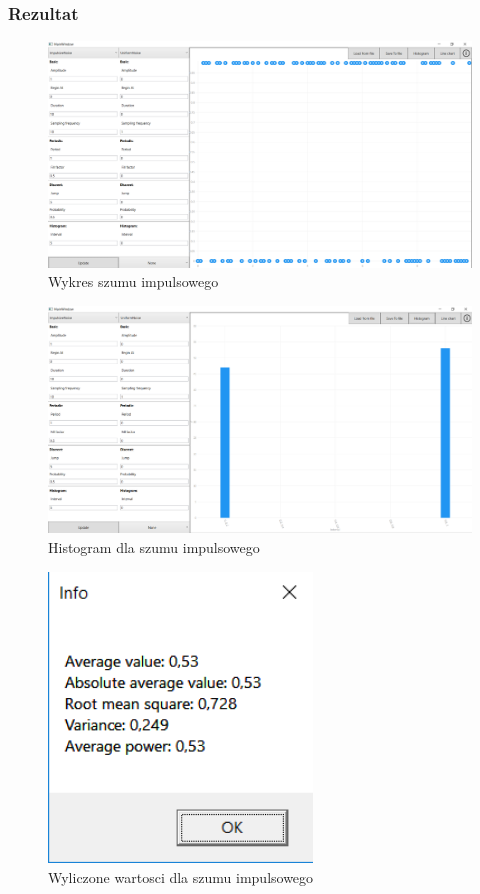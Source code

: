 \documentclass[12pt]{article}
\begin{document}
\subsubsection{Rezultat}

\begin{figure}[H]
 \centering
 \includegraphics[width=14cm]{images/imp1.PNG}
 \vspace{-0.3cm}
 \caption{Wykres szumu impulsowego}
 \label{gui}
\end{figure}

\begin{figure}[H]
 \centering
 \includegraphics[width=14cm]{images/imp1hist.PNG}
 \vspace{-0.3cm}
 \caption{Histogram dla szumu impulsowego}
 \label{gui}
\end{figure}

\begin{figure}[H]
 \centering
 \includegraphics[width=7cm]{images/imp1info.PNG}
 \vspace{-0.3cm}
 \caption{Wyliczone wartosci dla szumu impulsowego}
 \label{gui}
\end{figure}
\end{document}
